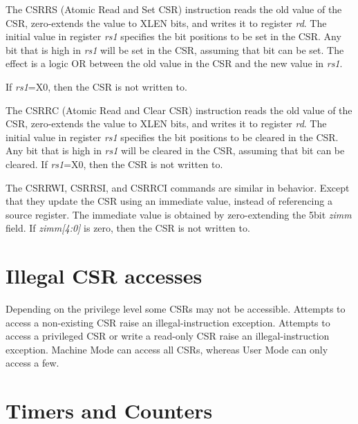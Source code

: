 The CSRRS (Atomic Read and Set CSR) instruction reads the old value of
the CSR, zero-extends the value to XLEN bits, and writes it to register
\emph{rd}. The initial value in register \emph{rs1} specifies the bit
positions to be set in the CSR. Any bit that is high in \emph{rs1} will
be set in the CSR, assuming that bit can be set. The effect is a logic
OR between the old value in the CSR and the new value in \emph{rs1}.

If \emph{rs1}=X0, then the CSR is not written to.

The CSRRC (Atomic Read and Clear CSR) instruction reads the old value of
the CSR, zero-extends the value to XLEN bits, and writes it to register
\emph{rd}. The initial value in register \emph{rs1} specifies the bit
positions to be cleared in the CSR. Any bit that is high in \emph{rs1}
will be cleared in the CSR, assuming that bit can be cleared. If
\emph{rs1}=X0, then the CSR is not written to.

The CSRRWI, CSRRSI, and CSRRCI commands are similar in behavior. Except
that they update the CSR using an immediate value, instead of
referencing a source register. The immediate value is obtained by
zero-extending the 5bit \emph{zimm} field. If \emph{zimm{[}4:0{]}} is
zero, then the CSR is not written to.

\section{Illegal CSR accesses}\label{illegal-csr-accesses}

Depending on the privilege level some CSRs may not be accessible.
Attempts to access a non-existing CSR raise an illegal-instruction
exception. Attempts to access a privileged CSR or write a read-only CSR
raise an illegal-instruction exception. Machine Mode can access all
CSRs, whereas User Mode can only access a
few.

\section{Timers and Counters}\label{timers-and-counters}

